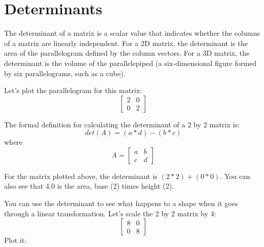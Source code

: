\section{Determinants}
The determinant of a matrix is a scalar value that indicates whether the 
columns of a matrix are linearly independent. For a 2D matrix, the determinant 
is the area of the parallelogram defined by the column vectors. For a 3D 
matrix, the determinant is the volume of the parallelepiped (a six-dimensional 
figure formed by six parallelograms, such as a cube). 

Let's plot the parallelogram for this matrix:
$$
\begin{bmatrix}
2 & 0  \\
0 & 2 
\end{bmatrix}
$$

 
The formal definition for calculating the determinant of a 2 by 2 matrix is:
$$det(A) = (a*d)-(b*c)$$
where
$$A = 
\begin{bmatrix}
a & b  \\
c & d 
\end{bmatrix}
$$

For the matrix plotted above, the determinant is $(2*2)+(0*0)$. You can also 
see that 4.0 is the area, base (2) times height (2).

You can use the determinant to see what happens to a shape when it goes 
through a linear transformation. Let's scale the 2 by 2 matrix by 4:
$$
\begin{bmatrix}
8 & 0  \\
0 & 8 
\end{bmatrix}
$$
Plot it:


